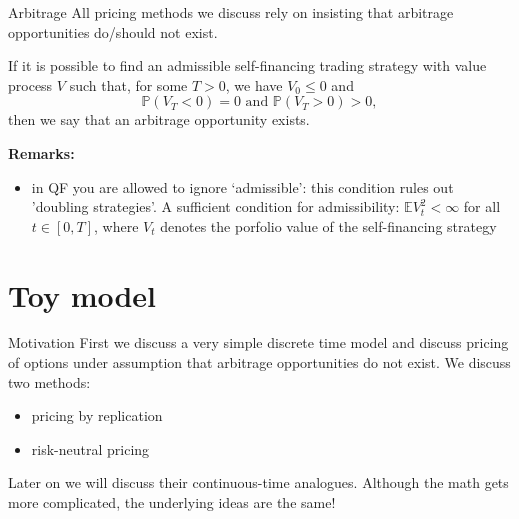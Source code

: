 \documentclass[pdf, handout]{beamer}
\begin{document}
\begin{frame}{Arbitrage}
All pricing methods we discuss rely on insisting that arbitrage opportunities do/should not
exist.

\begin{definition}
If it is possible to find an admissible self-financing trading strategy with value process $V$ such that, for some  $T>0$, we have
$V_0\leq 0$ and
\[
\mathbb{P}( V_T< 0 )=0 \text{ and }  \mathbb{P}( V_T> 0 )>0,
\]
then we say that an arbitrage opportunity exists.
\end{definition}
\textbf{Remarks:}
\begin{itemize}
\item in QF you are allowed to ignore `admissible': this condition rules out 'doubling strategies'. A sufficient condition for admissibility: $\mathbb{E}V_t^2<\infty$ for all $t\in[0,T]$, 
where $V_t$ denotes the porfolio value of the self-financing strategy
\end{itemize}

\end{frame}

\section{Toy model}

\begin{frame}{Motivation}
First we discuss a very simple discrete time model and discuss pricing of options under assumption that arbitrage opportunities do not exist.
We discuss two methods:
\begin{itemize}
\item pricing by replication
\item risk-neutral pricing
\end{itemize}
Later on we will discuss their continuous-time analogues.
Although the math gets more complicated, 
the underlying ideas are the same!
\end{frame}
\end{document}
